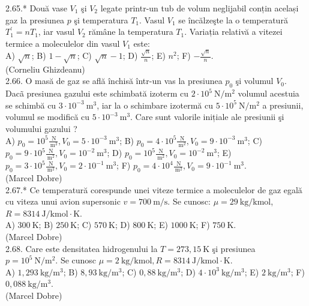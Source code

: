 2.65.* Două vase $V_{1}$ şi $V_{2}$ legate printr-un tub de volum neglijabil conțin același gaz la presiunea $p$ şi temperatura $T_{1}$. Vasul $V_{1}$ se încălzeşte la o temperatură $T_{1}^{\prime}=n T_{1}$, iar vasul $V_{2}$ rămâne la temperatura $T_{1}$. Variația relativă a vitezei termice a moleculelor din vasul $V_{1}$ este:\\ A) $\sqrt{n}$; B) $1-\sqrt{n}$; C) $\sqrt{n}-1$; D) $\frac{\sqrt{n}}{n}$; E) $n^{2}$; F) $-\frac{\sqrt{n}}{n}$.\\ (Corneliu Ghizdeanu)\\

2.66. O masă de gaz se află închisă într-un vas la presiunea $p_{0}$ şi volumul $V_{0}$. Dacã presiunea gazului este schimbată izoterm cu $2 \cdot 10^{5} \mathrm{~N} / \mathrm{m}^{2}$ volumul acestuia se schimbă cu $3 \cdot 10^{-3} \mathrm{~m}^{3}$, iar la o schimbare izotermă cu $5 \cdot 10^{5} \mathrm{~N} / \mathrm{m}^{2}$ a presiunii, volumul se modifică cu $5 \cdot 10^{-3} \mathrm{~m}^{3}$. Care sunt valorile inițiale ale presiunii şi volumului gazului ?\\ A) $p_{0}=10^{5} \frac{\mathrm{~N}}{\mathrm{~m}^{2}} , V_{0}=5 \cdot 10^{-3} \mathrm{~m}^{3}$; B) $p_{0}=4 \cdot 10^{5} \frac{\mathrm{~N}}{\mathrm{~m}^{2}} , V_{0}=9 \cdot 10^{-3} \mathrm{~m}^{3}$; C) $p_{0}=9 \cdot 10^{5} \frac{\mathrm{~N}}{\mathrm{~m}^{2}} , V_{0}=10^{-2} \mathrm{~m}^{3}$; D) $p_{0}=10^{5} \frac{\mathrm{~N}}{\mathrm{~m}^{2}} , V_{0}=10^{-2} \mathrm{~m}^{3}$; E) $p_{0}=3 \cdot 10^{5} \frac{\mathrm{~N}}{\mathrm{~m}^{2}} , V_{0}=2 \cdot 10^{-1} \mathrm{~m}^{3}$; F) $p_{0}=4 \cdot 10^{4} \frac{\mathrm{~N}}{\mathrm{~m}^{2}} , V_{0}=9 \cdot 10^{-1} \mathrm{~m}^{3}$.\\ (Marcel Dobre)\\

2.67.* Ce temperatură corespunde unei viteze termice a moleculelor de gaz egală cu viteza unui avion supersonic $v=700 \mathrm{~m} / \mathrm{s}$. Se cunosc: $\mu=29 \mathrm{~kg} / \mathrm{kmol}$, $R=8314 \mathrm{~J} / \mathrm{kmol} \cdot \mathrm{K}$.\\ A) $300 \mathrm{~K}$; B) $250 \mathrm{~K}$; C) $570 \mathrm{~K}$; D) $800 \mathrm{~K}$; E) $1000 \mathrm{~K}$; F) $750 \mathrm{~K}$.\\ (Marcel Dobre)\\

2.68. Care este densitatea hidrogenului la $T=273,15 \mathrm{~K}$ şi presiunea $p=10^{5} \mathrm{~N} / \mathrm{m}^{2}$. Se cunosc $\mu=2 \mathrm{~kg} / \mathrm{kmol}, R=8314 \mathrm{~J} / \mathrm{kmol} \cdot \mathrm{K}$.\\ A) $1,293 \mathrm{~kg} / \mathrm{m}^{3}$; B) $8,93 \mathrm{~kg} / \mathrm{m}^{3}$; C) $0,88 \mathrm{~kg} / \mathrm{m}^{3}$; D) $4 \cdot 10^{3} \mathrm{~kg} / \mathrm{m}^{3}$; E) $2 \mathrm{~kg} / \mathrm{m}^{3}$; F) $0,088 \mathrm{~kg} / \mathrm{m}^{3}$.\\ (Marcel Dobre)\\

